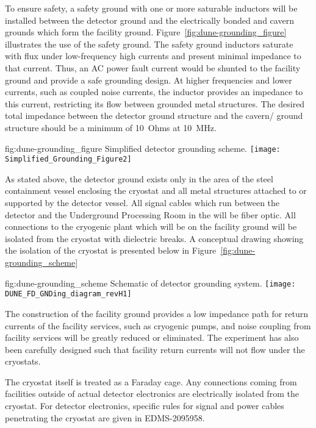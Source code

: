 To ensure safety, a safety ground with one or more saturable inductors
will be installed between the detector ground and the electrically
bonded  and cavern grounds which form the facility ground.
Figure~\ref{fig:dune-grounding_figure} illustrates the use of the
safety ground. The safety ground inductors saturate with flux under
low-frequency high currents and present minimal impedance to that
current.  Thus, an AC power fault current would be shunted to the
facility ground and provide a safe grounding design. At higher
frequencies and lower currents, such as coupled noise currents, the
inductor provides an impedance to this current, restricting its flow
between grounded metal structures. The desired total impedance between
the detector ground structure and the cavern/ ground
structure should be a minimum of \SI{10}{Ohms} at \SI{10}{MHz}.
\begin{dunefigure}{fig:dune-grounding_figure}
  {Simplified detector grounding scheme.}
  \texttt{[image: Simplified\_Grounding\_Figure2]}
\end{dunefigure}

As stated above, the detector ground exists only in the area of the
steel containment vessel enclosing the cryostat and all metal
structures attached to or supported by the detector vessel.  All
signal cables which run between the detector and the  Underground
Processing Room in the  will be fiber optic.
All connections to the cryogenic plant which will be on the facility
ground will be isolated from the cryostat with dielectric breaks.  A
conceptual drawing showing the isolation of the cryostat is presented
below in Figure~\ref{fig:dune-grounding_scheme}
\begin{dunefigure}{fig:dune-grounding_scheme}
  {Schematic of detector grounding system.}
  \texttt{[image: DUNE\_FD\_GNDing\_diagram\_revH1]}
\end{dunefigure}

The construction of the facility ground provides a low impedance path
for return currents of the facility services, such as cryogenic pumps,
and noise coupling from facility services will be greatly reduced or
eliminated.  The experiment has also been carefully designed such that
facility return currents will not flow under the cryostats.

The cryostat itself is treated as a Faraday cage.  Any connections
coming from facilities outside of actual detector electronics are
electrically isolated from the cryostat.  For detector electronics,
specific rules for signal and power cables penetrating the cryostat
are given in EDMS-2095958\cite{bib:cernedms2095958}.





